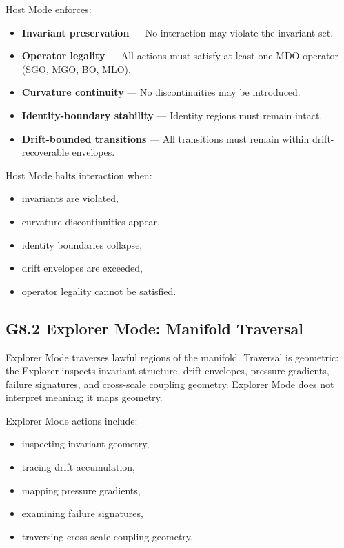 \medskip

\noindent Host Mode enforces:

\begin{itemize}[leftmargin=1.2cm]
    \item \textbf{Invariant preservation} — No interaction may violate the
    invariant set.
    \item \textbf{Operator legality} — All actions must satisfy at least one MDO
    operator (SGO, MGO, BO, MLO).
    \item \textbf{Curvature continuity} — No discontinuities may be introduced.
    \item \textbf{Identity-boundary stability} — Identity regions must remain
    intact.
    \item \textbf{Drift-bounded transitions} — All transitions must remain within
    drift-recoverable envelopes.
\end{itemize}

\medskip

\noindent Host Mode halts interaction when:

\begin{itemize}[leftmargin=1.2cm]
    \item invariants are violated,
    \item curvature discontinuities appear,
    \item identity boundaries collapse,
    \item drift envelopes are exceeded,
    \item operator legality cannot be satisfied.
\end{itemize}

\medskip

\subsection*{G8.2 Explorer Mode: Manifold Traversal}

\noindent Explorer Mode traverses lawful regions of the manifold. Traversal is
geometric: the Explorer inspects invariant structure, drift envelopes, pressure
gradients, failure signatures, and cross-scale coupling geometry. Explorer Mode
does not interpret meaning; it maps geometry.

\medskip

\noindent Explorer Mode actions include:

\begin{itemize}[leftmargin=1.2cm]
    \item inspecting invariant geometry,
    \item tracing drift accumulation,
    \item mapping pressure gradients,
    \item examining failure signatures,
    \item traversing cross-scale coupling geometry.
\end{itemize}

